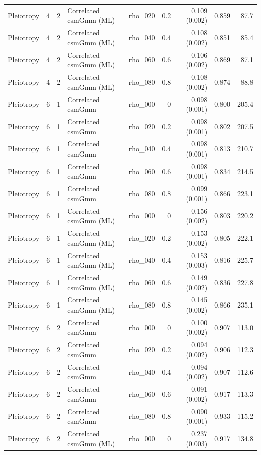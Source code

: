 \begin{longtable}{lcclrrrrr}
Pleiotropy & 4 & 2 & Correlated csmGmm (ML) & rho\_020 & 0.2 & 0.109 (0.002) & 0.859 & 87.7\\
Pleiotropy & 4 & 2 & Correlated csmGmm (ML) & rho\_040 & 0.4 & 0.108 (0.002) & 0.851 & 85.4\\
Pleiotropy & 4 & 2 & Correlated csmGmm (ML) & rho\_060 & 0.6 & 0.106 (0.002) & 0.869 & 87.1\\
Pleiotropy & 4 & 2 & Correlated csmGmm (ML) & rho\_080 & 0.8 & 0.108 (0.002) & 0.874 & 88.8\\
Pleiotropy & 6 & 1 & Correlated csmGmm & rho\_000 & 0 & 0.098 (0.001) & 0.800 & 205.4\\
Pleiotropy & 6 & 1 & Correlated csmGmm & rho\_020 & 0.2 & 0.098 (0.001) & 0.802 & 207.5\\
Pleiotropy & 6 & 1 & Correlated csmGmm & rho\_040 & 0.4 & 0.098 (0.001) & 0.813 & 210.7\\
Pleiotropy & 6 & 1 & Correlated csmGmm & rho\_060 & 0.6 & 0.098 (0.001) & 0.834 & 214.5\\
Pleiotropy & 6 & 1 & Correlated csmGmm & rho\_080 & 0.8 & 0.099 (0.001) & 0.866 & 223.1\\
Pleiotropy & 6 & 1 & Correlated csmGmm (ML) & rho\_000 & 0 & 0.156 (0.002) & 0.803 & 220.2\\
Pleiotropy & 6 & 1 & Correlated csmGmm (ML) & rho\_020 & 0.2 & 0.153 (0.002) & 0.805 & 222.1\\
Pleiotropy & 6 & 1 & Correlated csmGmm (ML) & rho\_040 & 0.4 & 0.153 (0.003) & 0.816 & 225.7\\
Pleiotropy & 6 & 1 & Correlated csmGmm (ML) & rho\_060 & 0.6 & 0.149 (0.002) & 0.836 & 227.8\\
Pleiotropy & 6 & 1 & Correlated csmGmm (ML) & rho\_080 & 0.8 & 0.145 (0.002) & 0.866 & 235.1\\
Pleiotropy & 6 & 2 & Correlated csmGmm & rho\_000 & 0 & 0.100 (0.002) & 0.907 & 113.0\\
Pleiotropy & 6 & 2 & Correlated csmGmm & rho\_020 & 0.2 & 0.094 (0.002) & 0.906 & 112.3\\
Pleiotropy & 6 & 2 & Correlated csmGmm & rho\_040 & 0.4 & 0.094 (0.002) & 0.907 & 112.6\\
Pleiotropy & 6 & 2 & Correlated csmGmm & rho\_060 & 0.6 & 0.091 (0.002) & 0.917 & 113.3\\
Pleiotropy & 6 & 2 & Correlated csmGmm & rho\_080 & 0.8 & 0.090 (0.001) & 0.933 & 115.2\\
Pleiotropy & 6 & 2 & Correlated csmGmm (ML) & rho\_000 & 0 & 0.237 (0.003) & 0.917 & 134.8\\

\end{longtable}
